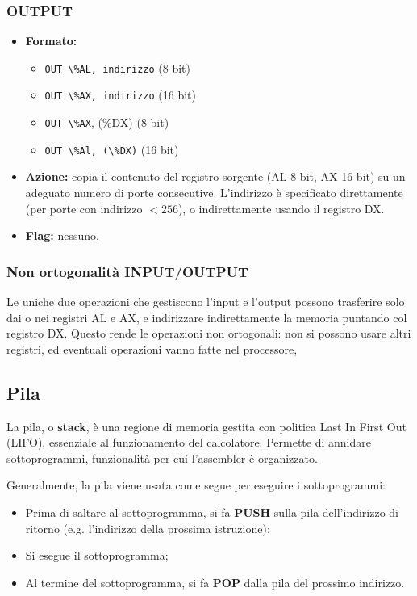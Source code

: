 \documentclass[a4paper,11pt]{article}
\begin{document}
\subsubsection{OUTPUT}
\begin{itemize}
	\item \textbf{Formato:}
		\begin{itemize}
			\item \lstinline|OUT \%AL, indirizzo| (8 bit)
			\item \lstinline|OUT \%AX, indirizzo| (16 bit)
			\item \lstinline|OUT \%AX|, (\%DX) (8 bit) 
			\item \lstinline|OUT \%Al, (\%DX)| (16 bit)
		\end{itemize}
	\item \textbf{Azione:} copia il contenuto del registro sorgente (AL 8 bit, AX 16 bit) su un adeguato numero di porte consecutive.
		L'indirizzo è specificato direttamente (per porte con indirizzo $<256$), o indirettamente usando il registro DX.
	\item \textbf{Flag:} nessuno.
\end{itemize}

\subsubsection{Non ortogonalità INPUT/OUTPUT}
Le uniche due operazioni che gestiscono l'input e l'output possono trasferire solo dai o nei registri AL e AX, e indirizzare indirettamente la memoria puntando col registro DX.
Questo rende le operazioni non ortogonali: non si possono usare altri registri, ed eventuali operazioni vanno fatte nel processore,

\subsection{Pila}
La pila, o \textbf{stack}, è una regione di memoria gestita con politica Last In First Out (LIFO), essenziale al funzionamento del calcolatore.
Permette di annidare sottoprogrammi, funzionalità per cui l'assembler è organizzato.

Generalmente, la pila viene usata come segue per eseguire i sottoprogrammi:
\begin{itemize}
	\item Prima di saltare al sottoprogramma, si fa \textbf{PUSH} sulla pila dell'indirizzo di ritorno (e.g. l'indirizzo della prossima istruzione);
	\item Si esegue il sottoprogramma;
	\item Al termine del sottoprogramma, si fa \textbf{POP} dalla pila del prossimo indirizzo.
\end{itemize}
\end{document}
